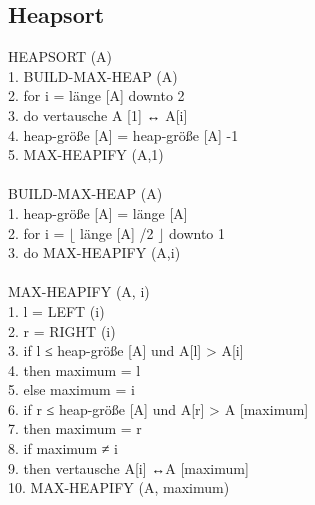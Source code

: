 \documentclass[10pt,a4paper]{scrartcl}
\begin{document}
\subsection{Heapsort}

HEAPSORT (A)\\
1.  BUILD-MAX-HEAP (A)\\
2.  for i = länge [A] downto 2\\
3. 	do vertausche A [1] ↔ A[i]\\
4. 	heap-größe [A] = heap-größe [A] -1\\
5.	MAX-HEAPIFY (A,1)\\
\\
BUILD-MAX-HEAP (A)\\
1.  heap-größe [A] = länge [A]\\
2.  for i = $\lfloor$ länge [A] /2 $\rfloor$ downto 1\\
3.  \quad do MAX-HEAPIFY (A,i)\\
\\
MAX-HEAPIFY (A, i)\\
1.  l = LEFT (i)\\
2.  r = RIGHT (i)\\
3.  if l ≤ heap-größe [A] und A[l] > A[i]\\
4. 	\quad then maximum = l\\
5. 	\quad else maximum = i\\
6.  if r ≤ heap-größe [A] und A[r] > A [maximum]\\
7.  \quad then maximum = r\\
8.  if maximum ≠ i\\
9.  \quad then vertausche A[i] ↔A [maximum]\\
10. \qquad MAX-HEAPIFY (A, maximum)\\
\end{document}
